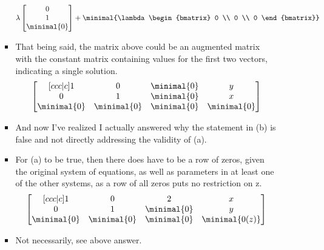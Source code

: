 \documentclass[basic]{inVerba-notes}
\begin{document}
\begin{enumerate}
\begin{enumerate}
\begin{itemize}
\[    \lambda\begin{bmatrix} 0 \\ 1 \\ \minimal{0} \end{bmatrix} + 
    \minimal{\lambda\begin{bmatrix} 0 \\ 0 \\ 0 \end{bmatrix}}
    \]%
    \item That being said, the matrix above could be an augmented matrix with the constant matrix containing values for the first two vectors, indicating a single solution. 
    \[%
    \begin{bmatrix}[ccc|c]
    1 & 0 & \minimal{0} & y \\
    0 & 1 & \minimal{0} & x \\
    \minimal{0} & \minimal{0} & \minimal{0} & \minimal{0}
    \end{bmatrix}
    \]%
    \item And now I've realized I actually answered why the statement in (b) is false and not directly addressing the validity of (a).
    \item For (a) to be true, then there does have to be a row of zeros, given the original system of equations, as well as parameters in at least one of the other systems, as a row of all zeros puts no restriction on z.
    \[%
    \begin{bmatrix}[ccc|c]
      1 & 0 & 2 & x \\
      0 & 1 & \minimal{0} & y \\
      \minimal{0} & \minimal{0} & \minimal{0} & \minimal{0(z)}
    \end{bmatrix}
    \]%
    \end{itemize}
    \begin{itemize}
      \item Not necessarily, see above answer.
    \end{itemize}
      \begin{itemize}

\end{itemize}
\end{enumerate}
\end{enumerate}
\end{document}
